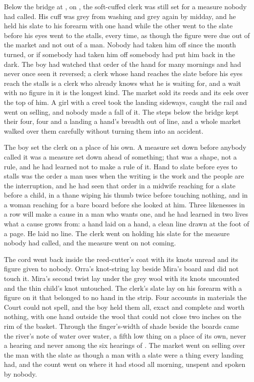 Below the bridge at , on , the soft-cuffed clerk was still set for a measure nobody had called. His cuff was grey from washing and grey again by midday, and he held his slate to his forearm with one hand while the other went to the slate before his eyes went to the stalls, every time, as though the figure were due out of the market and not out of a man. Nobody had taken him off since the month turned, or if somebody had taken him off somebody had put him back in the dark. The boy had watched that order of the hand for many mornings and had never once seen it reversed; a clerk whose hand reaches the slate before his eyes reach the stalls is a clerk who already knows what he is waiting for, and a wait with no figure in it is the longest kind. The market sold its reeds and its eels over the top of him. A girl with a creel took the landing sideways, caught the rail and went on selling, and nobody made a fall of it. The steps below the bridge kept their four, four and a landing a hand's breadth out of line, and a whole market walked over them carefully without turning them into an accident.

The boy set the clerk on a place of his own. A measure set down before anybody called it was a measure set down ahead of something; that was a shape, not a rule, and he had learned not to make a rule of it. Hand to slate before eyes to stalls was the order a man uses when the writing is the work and the people are the interruption, and he had seen that order in a midwife reaching for a slate before a child, in a thane wiping his thumb twice before touching nothing, and in a woman reaching for a bare board before she looked at him. Three likenesses in a row will make a cause in a man who wants one, and he had learned in two lives what a cause grows from: a hand laid on a hand, a clean line drawn at the foot of a page. He laid no line. The clerk went on holding his slate for the measure nobody had called, and the measure went on not coming.

The cord went back inside the reed-cutter's coat with its knots unread and its figure given to nobody. Orra's knot-string lay beside Mira's board and did not touch it. Mira's second twist lay under the grey wool with its knots uncounted and the thin child's knot untouched. The clerk's slate lay on his forearm with a figure on it that belonged to no hand in the strip. Four accounts in materials the Court could not spell, and the boy held them all, exact and complete and worth nothing, with one hand outside the wool that could not close two inches on the rim of the basket. Through the finger's-width of shade beside the boards came the river's note of water over water, a fifth low thing on a place of its own, never a hearing and never among the six hearings of . The market went on selling over the man with the slate as though a man with a slate were a thing every landing had, and the count went on where it had stood all morning, unspent and spoken by nobody.
